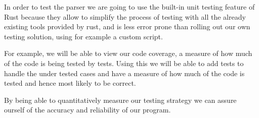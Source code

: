 

In order to test the parser we are going to use the built-in unit testing
feature of Rust because they allow to simplify the process of testing with all
the already existing tools provided by rust, and is less error prone than
rolling out our own testing solution, using for example a custom script.

For example, we will be able to view our code coverage, a measure of how much
of the code is being tested by tests. Using this we will be able to add tests
to handle the under tested cases and have a measure of how much of the code is
tested and hence most likely to be correct.

By being able to quantitatively measure our testing strategy we can assure
ourself of the accuracy and reliability of our program.
